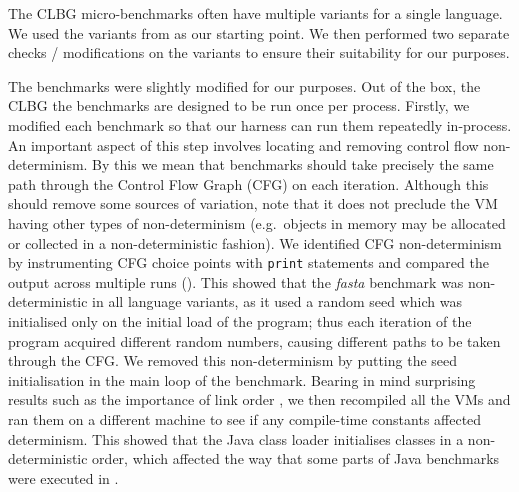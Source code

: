 \documentclass[10pt,preprint]{sigplanconf}
\newcommand{\fasta}{\emph{fasta}\xspace}
\begin{document}
The CLBG micro-benchmarks often have multiple variants for a single language. We
used the variants from \cite{bolz14impact} as our starting point. We then
performed two separate checks / modifications on the variants to ensure their
suitability for our purposes.

The benchmarks were slightly modified for our purposes. Out of the box, the
CLBG the benchmarks are designed to be run once per process. Firstly, we
modified each benchmark so that our harness can run them repeatedly in-process.
An important aspect of this step involves locating and removing control flow
non-determinism. By this we mean that benchmarks should take precisely the same
path through the Control Flow Graph (CFG) on each iteration. Although this
should remove some sources of variation, note that it does not preclude the VM
having other types of non-determinism (e.g.~objects in memory may be allocated
or collected in a non-deterministic fashion). We identified CFG non-determinism
by instrumenting CFG choice points with \texttt{print} statements and compared
the output across multiple runs (). This showed that the \fasta
benchmark was non-deterministic in all language variants, as it used a random
seed which was
initialised only on the initial load of the program; thus each iteration of the
program acquired different random numbers, causing different paths to be taken
through the CFG. We removed this non-determinism by putting the seed
initialisation in the main loop of the benchmark. Bearing in mind surprising
results such as the importance of link order \cite{mytkowicz09surprising}, we
then recompiled all the VMs and ran them on a different machine to see if any
compile-time constants affected determinism.  This showed that the Java class loader
initialises classes in a non-deterministic order, which affected the way that
some parts of Java benchmarks were executed in  .
\end{document}
